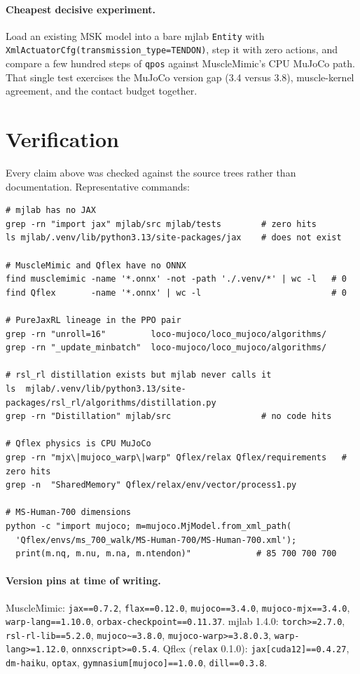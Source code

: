 \documentclass[11pt,a4paper]{article}
\begin{document}
\paragraph{Cheapest decisive experiment.} Load an existing MSK model into a bare mjlab
\texttt{Entity} with \texttt{XmlActuatorCfg(transmission\_type=TENDON)}, step it with zero
actions, and compare a few hundred steps of \texttt{qpos} against MuscleMimic's CPU MuJoCo
path. That single test exercises the MuJoCo version gap (3.4 versus 3.8), muscle-kernel
agreement, and the contact budget together.

\appendix
\section{Verification}

Every claim above was checked against the source trees rather than documentation.
Representative commands:

\begin{lstlisting}
# mjlab has no JAX
grep -rn "import jax" mjlab/src mjlab/tests        # zero hits
ls mjlab/.venv/lib/python3.13/site-packages/jax    # does not exist

# MuscleMimic and Qflex have no ONNX
find musclemimic -name '*.onnx' -not -path './.venv/*' | wc -l   # 0
find Qflex       -name '*.onnx' | wc -l                          # 0

# PureJaxRL lineage in the PPO pair
grep -rn "unroll=16"         loco-mujoco/loco_mujoco/algorithms/
grep -rn "_update_minbatch"  loco-mujoco/loco_mujoco/algorithms/

# rsl_rl distillation exists but mjlab never calls it
ls  mjlab/.venv/lib/python3.13/site-packages/rsl_rl/algorithms/distillation.py
grep -rn "Distillation" mjlab/src                  # no code hits

# Qflex physics is CPU MuJoCo
grep -rn "mjx\|mujoco_warp\|warp" Qflex/relax Qflex/requirements   # zero hits
grep -n  "SharedMemory" Qflex/relax/env/vector/process1.py

# MS-Human-700 dimensions
python -c "import mujoco; m=mujoco.MjModel.from_xml_path(
  'Qflex/envs/ms_700_walk/MS-Human-700/MS-Human-700.xml');
  print(m.nq, m.nu, m.na, m.ntendon)"             # 85 700 700 700
\end{lstlisting}

\paragraph{Version pins at time of writing.}
MuscleMimic: \texttt{jax==0.7.2}, \texttt{flax==0.12.0}, \texttt{mujoco==3.4.0},
\texttt{mujoco-mjx==3.4.0}, \texttt{warp-lang==1.10.0}, \texttt{orbax-checkpoint==0.11.37}.
mjlab 1.4.0: \texttt{torch>=2.7.0}, \texttt{rsl-rl-lib==5.2.0},
\texttt{mujoco\textasciitilde{}=3.8.0}, \texttt{mujoco-warp>=3.8.0.3},
\texttt{warp-lang>=1.12.0}, \texttt{onnxscript>=0.5.4}.
Qflex (\texttt{relax} 0.1.0): \texttt{jax[cuda12]==0.4.27}, \texttt{dm-haiku},
\texttt{optax}, \texttt{gymnasium[mujoco]==1.0.0}, \texttt{dill==0.3.8}.
\end{document}
